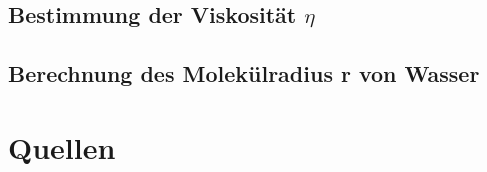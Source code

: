 \documentclass[]{scrartcl}
\begin{document}
\subsection{Bestimmung der Viskosität $\eta$}

\subsection{Berechnung des Molekülradius r von Wasser}
\section{Quellen}
\end{document}
